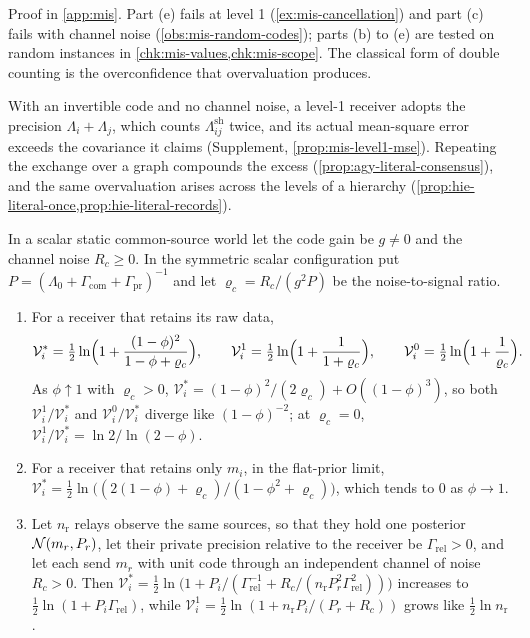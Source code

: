 Proof in \cref{app:mis}. Part (e) fails at level 1 (\cref{ex:mis-cancellation}) and part (c) fails with channel noise (\cref{obs:mis-random-codes}); parts (b) to (e) are tested on random instances in \cref{chk:mis-values,chk:mis-scope}. The classical form of double counting is the overconfidence that overvaluation produces.

With an invertible code and no channel noise, a level-1 receiver adopts the precision $\Lambda_i+\Lambda_j$, which counts $\Lambda^{\mathrm{sh}}_{ij}$ twice, and its actual mean-square error exceeds the covariance it claims (Supplement, \cref{prop:mis-level1-mse}). Repeating the exchange over a graph compounds the excess (\cref{prop:agy-literal-consensus}), and the same overvaluation arises across the levels of a hierarchy (\cref{prop:hie-literal-once,prop:hie-literal-records}).

\begin{proposition}\label{prop:mis-closed-ratios}
In a scalar static common-source world let the code gain be $g\neq0$ and the channel noise $R_c\ge0$. In the symmetric scalar configuration put $P=(\Lambda_0+\Gamma_{\mathrm{com}}+\Gamma_{\mathrm{pr}})^{-1}$ and let $\varrho_c=R_c/(g^2P)$ be the noise-to-signal ratio.
\begin{enumerate}
\item[(a)] For a receiver that retains its raw data,
\begin{equation}\label{eq:mis-ratios}
\mathcal V^\ast_i=\tfrac12\ln\Bigl(1+\frac{(1-\phi)^2}{1-\phi+\varrho_c}\Bigr),\qquad\mathcal V^1_i=\tfrac12\ln\Bigl(1+\frac1{1+\varrho_c}\Bigr),\qquad\mathcal V^0_i=\tfrac12\ln\Bigl(1+\frac1{\varrho_c}\Bigr).
\end{equation}
As $\phi\uparrow1$ with $\varrho_c>0$, $\mathcal V^\ast_i=(1-\phi)^2/(2\varrho_c)+O((1-\phi)^3)$, so both $\mathcal V^1_i/\mathcal V^\ast_i$ and $\mathcal V^0_i/\mathcal V^\ast_i$ diverge like $(1-\phi)^{-2}$; at $\varrho_c=0$, $\mathcal V^1_i/\mathcal V^\ast_i=\ln2/\ln(2-\phi)$.
\item[(b)] For a receiver that retains only $m_i$, in the flat-prior limit, $\mathcal V^\ast_i=\tfrac12\ln\bigl((2(1-\phi)+\varrho_c)/(1-\phi^2+\varrho_c)\bigr)$, which tends to $0$ as $\phi\to1$.
\item[(c)] Let $n_{\mathrm r}$ relays observe the same sources, so that they hold one posterior $\mathcal{N}(m_r,P_r)$, let their private precision relative to the receiver be $\Gamma_{\mathrm{rel}}>0$, and let each send $m_r$ with unit code through an independent channel of noise $R_c>0$. Then $\mathcal V^\ast_i=\tfrac12\ln\bigl(1+P_i/(\Gamma_{\mathrm{rel}}^{-1}+R_c/(n_{\mathrm r}P_r^2\Gamma_{\mathrm{rel}}^2))\bigr)$ increases to $\tfrac12\ln(1+P_i\Gamma_{\mathrm{rel}})$, while $\mathcal V^1_i=\tfrac12\ln(1+n_{\mathrm r}P_i/(P_r+R_c))$ grows like $\tfrac12\ln n_{\mathrm r}$.
\end{enumerate}
\end{proposition}


